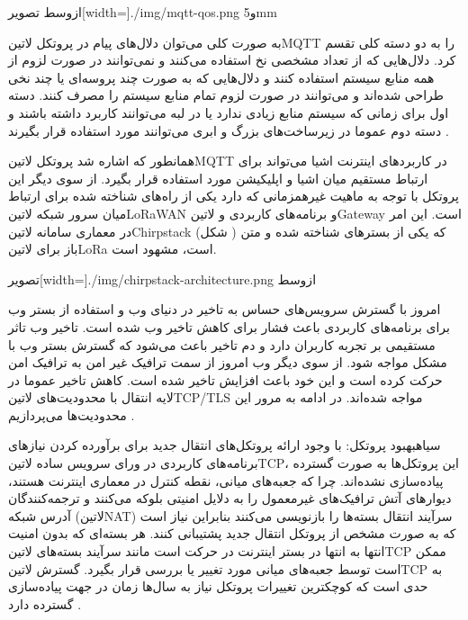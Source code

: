 ‌ازوسط
‌تصویر[width=\textwidth]{./img/mqtt-qos.png}
‌و{5mm}

به صورت کلی می‌توان دلال‌های پیام در پروتکل ‌لاتین{MQTT} را به دو دسته کلی تقسم کرد. دلال‌هایی که از تعداد مشخصی نخ استفاده می‌کنند و نمی‌توانند در صورت لزوم از همه منابع سیستم استفاده کنند و دلال‌هایی که به صورت چند پروسه‌ای یا چند نخی طراحی شده‌اند
و می‌توانند در صورت لزوم تمام منابع سیستم را مصرف کنند. دسته اول برای زمانی که سیستم منابع زیادی ندارد یا در لبه می‌توانند کاربرد داشته باشند و دسته دوم عموما در زیرساخت‌های بزرگ و ابری می‌توانند مورد استفاده قرار بگیرند
.

همانطور که اشاره شد پروتکل ‌لاتین{MQTT} در کاربردهای اینترنت اشیا می‌تواند برای ارتباط مستقیم میان اشیا و اپلیکیشن مورد استفاده قرار بگیرد. از سوی دیگر این پروتکل با توجه به ماهیت غیرهمزمانی که دارد یکی از راه‌های شناخته شده برای ارتباط میان سرور شبکه ‌لاتین{LoRaWAN}
و برنامه‌های کاربردی و ‌لاتین{Gateway} است. این امر در معماری سامانه ‌لاتین{Chirpstack} (شکل ) که یکی از بسترهای شناخته شده و متن باز برای ‌لاتین{LoRa} است، مشهود است.

‌تصویر[width=\textwidth]{./img/chirpstack-architecture.png}
‌ازوسط


امروز با گسترش سرویس‌های حساس به تاخیر در دنیای وب و استفاده از بستر وب برای برنامه‌های کاربردی باعث فشار برای کاهش تاخیر وب شده است. تاخیر وب تاثر مستقیمی بر تجربه کاربران دارد
و دم تاخیر باعث می‌شود که گسترش بستر وب با مشکل مواجه شود.
از سوی دیگر وب امروز از سمت ترافیک غیر امن به ترافیک امن حرکت کرده است و این خود باعث افزایش تاخیر شده است.
کاهش تاخیر عموما در لایه انتقال با محدودیت‌های ‌لاتین{TCP/TLS} مواجه شده‌اند. در ادامه به مرور این محدودیت‌ها می‌پردازیم
.

‌سیاه{بهبود پروتکل}: با وجود ارائه پروتکل‌های انتقال جدید برای برآورده کردن نیازهای برنامه‌های کاربردی در ورای سرویس ساده ‌لاتین{TCP}، این پروتکل‌ها به صورت گسترده پیاده‌سازی نشده‌اند.
چرا که جعبه‌های میانی، نقطه کنترل در معماری اینترنت هستند، دیوارهای آتش ترافیک‌های غیرمعمول را به دلایل امنیتی بلوکه می‌کنند و ترجمه‌کنندگان آدرس شبکه (‌لاتین{NAT})
سرآیند انتقال بسته‌ها را بازنویسی می‌کنند بنابراین نیاز است که به صورت مشخص از پروتکل انتقال جدید پشتیبانی کنند.
هر بسته‌ای که بدون امنیت انتها به انتها در بستر اینترنت در حرکت است مانند سرآیند بسته‌های ‌لاتین{TCP} ممکن است توسط جعبه‌های میانی مورد تغییر یا بررسی قرار بگیرد.
گسترش ‌لاتین{TCP} به حدی است که کوچکترین تغییرات پروتکل نیاز به سال‌ها زمان در جهت پیاده‌سازی گسترده دارد
.


